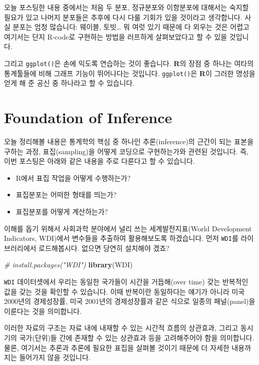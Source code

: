 \documentclass[]{book}
\newenvironment{Shaded}{\begin{snugshade}}{\end{snugshade}}
\newcommand{\CommentTok}[1]{\textcolor[rgb]{0.56,0.35,0.01}{\textit{#1}}}
\newcommand{\KeywordTok}[1]{\textcolor[rgb]{0.13,0.29,0.53}{\textbf{#1}}}
\newcommand{\NormalTok}[1]{#1}
\providecommand{\tightlist}{%
  \setlength{\itemsep}{0pt}\setlength{\parskip}{0pt}}
\begin{document}
오늘 포스팅한 내용 중에서는 처음 두 분포, 정규분포와 이항분포에 대해서는 숙지할 필요가 있고 나머지 분포들은 추후에 다시 다룰 기회가 있을 것이라고 생각합니다. 사실 분포는 엄청 많습니다: 웨이블, 토빗\ldots{} 뭐 여럿 있기 때문에 다 외우는 것은 어렵고 여기서는 단지 R-code로 구현하는 방법을 러프하게 살펴보았다고 할 수 있을 것입니다.

그리고 \texttt{ggplot()}은 손에 익도록 연습하는 것이 좋습니다. \textbf{R}의 장점 중 하나는 여타의 통계툴들에 비해 그래프 기능이 뛰어나다는 것입니다. \texttt{ggplot()}은 \textbf{R}이 그러한 명성을 얻게 해 준 공신 중 하나라고 할 수 있습니다.

\hypertarget{foundation-of-inference}{%
\chapter{Foundation of Inference}\label{foundation-of-inference}}

오늘 정리해볼 내용은 통계학의 핵심 중 하나인 추론(inference)의 근간이 되는 표본을 구하는 과정, 표집(sampling)을 어떻게 코딩으로 구현하는가와 관련된 것입니다. 즉, 이번 포스팅은 아래와 같은 내용을 주로 다룬다고 할 수 있습니다.

\begin{itemize}
\tightlist
\item
  R에서 표집 작업을 어떻게 수행하는가?
\item
  표집분포는 어떠한 형태를 띄는가?
\item
  표집분포를 어떻게 계산하는가?
\end{itemize}

이해를 돕기 위해서 사회과학 분야에서 널리 쓰는 세계발전지표(World Development Indicators, WDI)에서 변수들을 추출하여 활용해보도록 하겠습니다. 먼저 \texttt{WDI}를 라이브러리에서 로드해봅시다. 없으면 당연히 설치해야 겠죠?

\begin{Shaded}
\begin{Highlighting}[]
\CommentTok{# install.packages("WDI")}
\KeywordTok{library}\NormalTok{(WDI)}
\end{Highlighting}
\end{Shaded}

\texttt{WDI} 데이터셋에서 우리는 동일한 국가들이 시간을 거듭해(over time) 갖는 반복적인 값을 갖는 것을 확인할 수 있습니다. 이때 반복이란 동일하다는 얘기가 아니라 미국 2000년의 경제성장률, 미국 2001년의 경제성장률과 같은 식으로 일종의 패널(panel)을 이룬다는 것을 의미합니다.

이러한 자료의 구조는 자료 내에 내재할 수 있는 시간적 흐름의 상관효과, 그리고 동시기의 국가(단위)들 간에 존재할 수 있는 상관효과 등을 고려해주어야 함을 의미합니다. 물론, 여기서는 추론과 추론에 필요한 표집을 살펴볼 것이기 때문에 더 자세한 내용까지는 들어가지 않을 것입니다.
\end{document}
